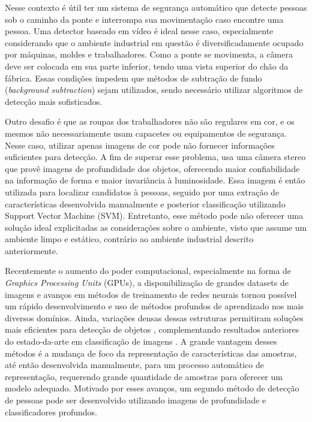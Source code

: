   Nesse contexto é útil ter um sistema de segurança automático que detecte pessoas sob o caminho da ponte e interrompa sua movimentação caso encontre uma pessoa. Uma detector baseado em vídeo é ideal nesse caso, especialmente considerando que o ambiente industrial em questão é diversificadamente ocupado por máquinas, moldes e trabalhadores. Como a ponte se movimenta, a câmera deve ser colocada em sua parte inferior, tendo uma vista superior do chão da fábrica. Essas condições impedem que métodos de subtração de fundo (\textit{background subtraction}) sejam utilizados, sendo necessário utilizar algoritmos de detecção mais sofisticados.

  Outro desafio é que as roupas dos trabalhadores não são regulares em cor, e os mesmos não necessariamente usam capacetes ou equipamentos de segurança. Nesse caso, utilizar apenas imagens de cor pode não fornecer informações suficientes para detecção. A fim de superar esse problema, \cite{rauter} usa uma câmera stereo que provê imagens de profundidade dos objetos, oferecendo maior confiabilidade na informação de forma e maior invariância à luminosidade. Essa imagem é então utilizada para localizar candidatos à pessoas, seguido por uma extração de características desenvolvida manualmente e posterior classificação utilizando Support Vector Machine (SVM). Entretanto, esse método pode não oferecer uma solução ideal explicitadas as considerações sobre o ambiente, visto que assume um ambiente limpo e estático, contrário ao ambiente industrial descrito anteriormente.

  Recentemente o aumento do poder computacional, especialmente na forma de \emph{Graphics Processing Units} (GPUs), a disponibilização de grandes datasets de imagens e avanços em métodos de treinamento de redes neurais \cite{nair2010relu} tornou possível um rápido desenvolvimento e uso de métodos profundos de aprendizado nos mais diversos domínios. Ainda, variações densas dessas estruturas permitiram soluções mais eficientes para detecção de objetos \cite{NIPS2013_5207}, complementando resultados anteriores do estado-da-arte em classificação de imagens \cite{hintonCONVNET}. A grande vantagem desses métodos é a mudança de foco da representação de características das amostras, até então desenvolvida manualmente, para um processo automático de representação, requerendo grande quantidade de amostras para oferecer um modelo adequado. Motivado por esses avanços, um segundo método de detecção de pessoas pode ser desenvolvido utilizando imagens de profundidade e classificadores profundos.

